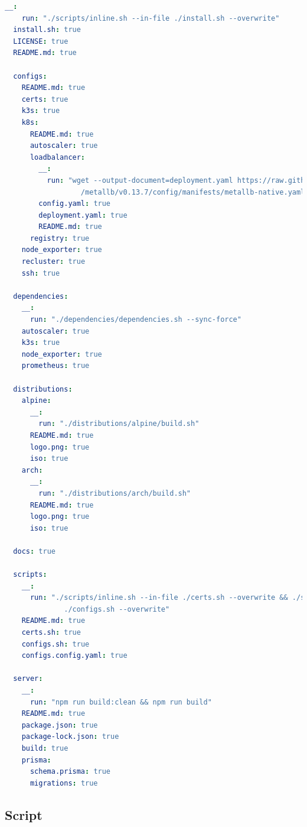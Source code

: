 \begin{lstlisting}[language=yaml, alsoletter={._-}, morekeywords={[2]{__, run, install.sh, LICENSE, README.md, configs, certs, k3s, k8s, autoscaler, loadbalancer, config.yaml, deployment.yaml, registry, node_exporter, recluster, ssh, dependencies, prometheus, distributions, alpine, arch, logo.png, iso, docs, scripts, certs.sh, configs.sh, configs.config.yaml, server, package.json, package-lock.json, build, prisma, schema.prisma, migrations}}, xleftmargin=\parindent, label={lst:bundle_config}, caption=Content of bundle configuration file]
  __:
    run: "./scripts/inline.sh --in-file ./install.sh --overwrite"
  install.sh: true
  LICENSE: true
  README.md: true

  configs:
    README.md: true
    certs: true
    k3s: true
    k8s:
      README.md: true
      autoscaler: true
      loadbalancer:
        __:
          run: "wget --output-document=deployment.yaml https://raw.githubusercontent.com/metallb
                  /metallb/v0.13.7/config/manifests/metallb-native.yaml"
        config.yaml: true
        deployment.yaml: true
        README.md: true
      registry: true
    node_exporter: true
    recluster: true
    ssh: true

  dependencies:
    __:
      run: "./dependencies/dependencies.sh --sync-force"
    autoscaler: true
    k3s: true
    node_exporter: true
    prometheus: true

  distributions:
    alpine:
      __:
        run: "./distributions/alpine/build.sh"
      README.md: true
      logo.png: true
      iso: true
    arch:
      __:
        run: "./distributions/arch/build.sh"
      README.md: true
      logo.png: true
      iso: true

  docs: true

  scripts:
    __:
      run: "./scripts/inline.sh --in-file ./certs.sh --overwrite && ./scripts/inline.sh --in-file
              ./configs.sh --overwrite"
    README.md: true
    certs.sh: true
    configs.sh: true
    configs.config.yaml: true

  server:
    __:
      run: "npm run build:clean && npm run build"
    README.md: true
    package.json: true
    package-lock.json: true
    build: true
    prisma:
      schema.prisma: true
      migrations: true
\end{lstlisting}

\subsection{Script}
\label{subsec:good_practices_bundle_script}

